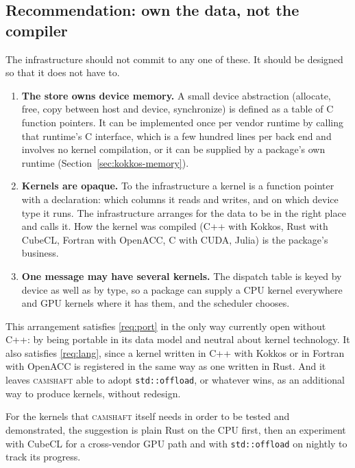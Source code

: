 \documentclass[11pt,a4paper]{article}
\newcommand{\camshaft}{\textsc{camshaft}}
\newcommand{\code}[1]{\texttt{#1}}
\begin{document}
\subsection{Recommendation: own the data, not the compiler}

The infrastructure should not commit to any one of these.  It should be
designed so that it does not have to.

\begin{enumerate}
  \item \textbf{The store owns device memory.}  A small device abstraction
        (allocate, free, copy between host and device, synchronize) is
        defined as a table of C function pointers.  It can be implemented
        once per vendor runtime by calling that runtime's C interface, which
        is a few hundred lines per back end and involves no kernel
        compilation, or it can be supplied by a package's own runtime
        (Section~\ref{sec:kokkos-memory}).
  \item \textbf{Kernels are opaque.}  To the infrastructure a kernel is a
        function pointer with a declaration: which columns it reads and
        writes, and on which device type it runs.  The infrastructure
        arranges for the data to be in the right place and calls it.  How the
        kernel was compiled (C++ with Kokkos, Rust with CubeCL, Fortran with
        OpenACC, C with CUDA, Julia) is the package's business.
  \item \textbf{One message may have several kernels.}  The dispatch table is
        keyed by device as well as by type, so a package can supply a CPU
        kernel everywhere and GPU kernels where it has them, and the
        scheduler chooses.
\end{enumerate}

This arrangement satisfies \ref{req:port} in the only way currently open
without C++: by being portable in its data model and neutral about kernel
technology.  It also satisfies \ref{req:lang}, since a kernel written in C++
with Kokkos or in Fortran with OpenACC is registered in the same way as one
written in Rust.  And
it leaves \camshaft{} able to adopt \code{std::offload}, or whatever wins, as an
additional way to produce kernels, without redesign.

For the kernels that \camshaft{} itself needs in order to be tested and
demonstrated, the suggestion is plain Rust on the CPU first, then an
experiment with CubeCL for a cross-vendor GPU path and with
\code{std::offload} on nightly to track its progress.
\end{document}
